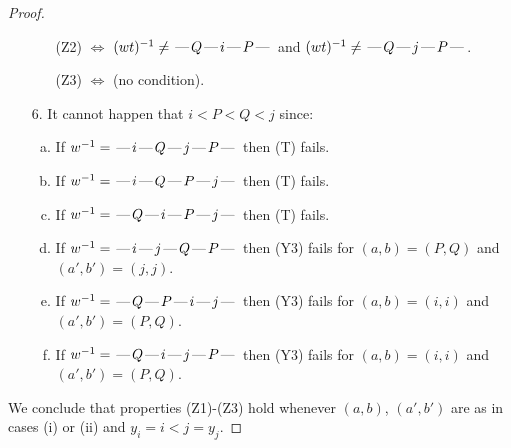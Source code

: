 \documentclass[10pt]{article}
\theoremstyle{definition}
\theoremstyle{definition}
\def\dash{\text{\hspace{0.5mm}---\hspace{0.5mm}}}
\begin{document}
\begin{proof}
\begin{enumerate}
\begin{enumerate}
\item[](Z2) $\Leftrightarrow$ $(wt)^{-1} \neq \dash Q \dash i \dash P \dash$ and $(wt)^{-1}\neq \dash Q \dash j \dash P \dash$.
\item[](Z3) $\Leftrightarrow$ (no condition).
\end{enumerate}
\item[$6$.] It cannot happen that $i < P < Q < j$ since:
\begin{enumerate}[(a)]
\item If $w^{-1} = \dash i\dash Q\dash j\dash P\dash $ then (T) fails.
\item If $w^{-1} = \dash i\dash Q\dash P\dash j\dash $ then (T) fails.
\item If $w^{-1} = \dash Q\dash i\dash P\dash j\dash $ then (T) fails.
\item If $w^{-1} = \dash i\dash j\dash Q\dash P\dash $ then (Y3) fails for $(a,b)=(P,Q)$ and $(a',b')=(j,j)$.
\item If $w^{-1} = \dash Q\dash P\dash i\dash j\dash $ then (Y3) fails for $(a,b)=(i,i)$ and $(a',b')=(P,Q)$.
\item If $w^{-1} = \dash Q\dash i\dash j\dash P\dash $ then (Y3) fails for $(a,b)=(i,i)$ and $(a',b')=(P,Q)$.
\end{enumerate}
\end{enumerate}
We conclude that properties (Z1)-(Z3) hold whenever $(a,b)$, $(a',b')$ are as in cases (i) or (ii) and $y_i = i < j = y_j$.

\end{proof}
\end{document}
